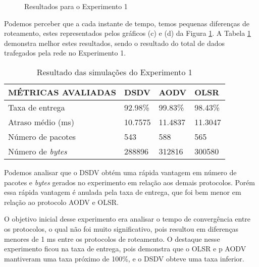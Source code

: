 \begin{figure}[H]
	\centering
	\label{subfig:exp1Lost}
	\label{subfig:exp1Late}
	\label{subfig:exp1Byte}
	\label{subfig:exp1Pkts}
	
	\caption{Resultados para o Experimento 1}
	\label{fig:resulExp1}
\end{figure}

Podemos perceber que a cada instante de tempo, temos pequenas diferen\c{c}as de roteamento, estes representados pelos gr\'aficos (c) e (d) da Figura \ref{fig:resulExp1}. A Tabela \ref{tabExp1Result} demonstra melhor estes resultados, sendo o resultado do total de dados trafegados pela rede no Experimento 1.

\begin{table}[H]
	\centering
	\caption{Resultado das simula\c{c}\~oes do Experimento 1}
	\begin{tabular}{ | l | l | l | l | }
		\hline
		M\'ETRICAS AVALIADAS & DSDV & AODV & OLSR \\ \hline
		Taxa de entrega & 92.98\% & 99.83\% & 98.43\% \\ \hline
		Atraso m\'edio (ms) & 10.7575 & 11.4837 & 11.3047 \\ \hline
		N\'umero de pacotes & 543 & 588 & 565 \\ \hline
		N\'umero de \textit{bytes} & 288896 & 312816 & 300580 \\ \hline
	\end{tabular}
	\label{tabExp1Result}
\end{table}

Podemos analisar que o DSDV obt\'em uma r\'apida vantagem em n\'umero de pacotes e \textit{bytes} gerados no experimento em rela\c{c}\~ao aos demais protocolos. Por\'em essa r\'apida vantagem \'e anulada pela taxa de entrega, que foi bem menor em rela\c{c}\~ao ao protocolo AODV e OLSR.

O objetivo inicial desse experimento era analisar o tempo de converg\^encia entre os protocolos, o qual n\~ao foi muito significativo, pois resultou em diferen\c{c}as menores de 1 ms entre os protocolos de roteamento. 
O destaque nesse experimento ficou na taxa de entrega, pois demonstra que o OLSR e p AODV mantiveram uma taxa pr\'oximo de 100\%, e o DSDV obteve uma taxa inferior.

